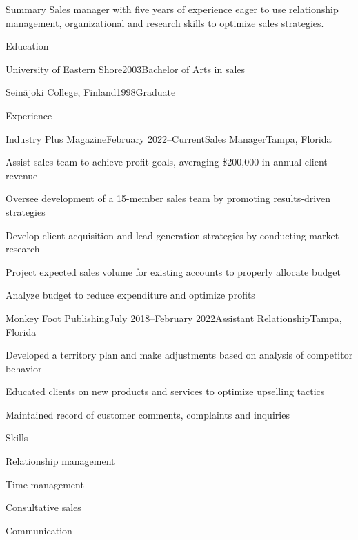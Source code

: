 \documentclass[11pt,a4paper]{resume}
\begin{document}
  \begin{rSection}{Summary}
  Sales manager with five years of experience eager to use relationship
management, organizational and research skills to optimize sales
strategies. 
  \end{rSection}

  \begin{rSection}{Education}
        \begin{eSubsection}{University of Eastern Shore}{2003}{Bachelor
of Arts in sales}{}
     \end{eSubsection}
        \begin{eSubsection}{Seinäjoki College,
Finland}{1998}{Graduate}{}
     \end{eSubsection}
      \end{rSection}
  
  
  \begin{rSection}{Experience}
        \begin{rSubsection}{Industry Plus Magazine}{February
2022--Current}{Sales Manager}{Tampa, Florida}
        \item Assist sales team to achieve profit goals, averaging
\$200,000 in annual client revenue
        \item Oversee development of a 15-member sales team by promoting
results-driven strategies
        \item Develop client acquisition and lead generation strategies
by conducting market research
        \item Project expected sales volume for existing accounts to
properly allocate budget
        \item Analyze budget to reduce expenditure and optimize profits
        \end{rSubsection}
        \begin{rSubsection}{Monkey Foot Publishing}{July 2018--February
2022}{Assistant Relationship}{Tampa, Florida}
        \item Developed a territory plan and make adjustments based on
analysis of competitor behavior
        \item Educated clients on new products and services to optimize
upselling tactics
        \item Maintained record of customer comments, complaints and
inquiries
        \end{rSubsection}
      \end{rSection}
  
  \begin{rSection}{Skills}
    \begin{lSubsection}
        \item Relationship management
        \item Time management
        \item Consultative sales
        \item Communication
        \end{lSubsection}
  \end{rSection}
\end{document}
